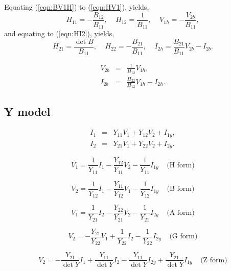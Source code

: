 \documentclass[a4paper, 12pt]{article}
\newcommand{\bigspace}{\;\;\;\;}
\newcommand{\refeqn}[1]{\mbox{(\ref{eqn:#1})}}
\begin{document}
Equating \refeqn{BV1H} to \refeqn{HV1}, yields,
%
\begin{equation}
  H_{11} = -\frac{B_{12}}{B_{11}}, \bigspace H_{12} = \frac{1}{B_{11}}, \bigspace V_{1h} = -\frac{V_{2b}}{B_{11}},
\end{equation}
%
and equating to \refeqn{HI2}, yields,
%
\begin{equation}
  H_{21} = \frac{\det{B}}{B_{11}}, \bigspace H_{22} = -\frac{B_{21}}{B_{11}}, \bigspace I_{2h} = \frac{B_{21}}{B_{11}} V_{2b} - I_{2b}.
\end{equation}


\begin{eqnarray}
  V_{2b} & = & \frac{1}{H_{12}} V_{1h}, \\
  I_{2b} & = & \frac{H_{22}}{H_{12}} V_{1h} - I_{2h}.
\end{eqnarray}




\subsection{Y model}

\begin{eqnarray}
\label{eqn:YI1}
  I_1 & = & Y_{11} V_1 + Y_{12} V_2 + I_{1y}, \\
  I_2 & = & Y_{21} V_1 + Y_{22} V_2 + I_{2y}.
\label{eqn:YI2}
\end{eqnarray}



\begin{equation}
  V_1 = \frac{1}{Y_{11}} I_1 - \frac{Y_{12}}{Y_{11}} V_2 - \frac{1}{Y_{11}} I_{1y} \bigspace \mbox{(H form)}
\end{equation}

\begin{equation}
  V_2 = \frac{1}{Y_{12}} I_1 - \frac{Y_{11}}{Y_{12}} V_1 - \frac{1}{Y_{12}} I_{1y} \bigspace \mbox{(B form)}
\end{equation}

\begin{equation}
  V_1 = \frac{1}{Y_{21}} I_2 - \frac{Y_{22}}{Y_{21}} V_2 - \frac{1}{Y_{21}} I_{2y} \bigspace \mbox{(A form)}
\end{equation}


\begin{equation}
  V_2 = -\frac{Y_{21}}{Y_{22}} V_1 + \frac{1}{Y_{22}} I_2 - \frac{1}{Y_{22}} I_{2y} \bigspace \mbox{(G form)}
\end{equation}


\begin{equation}
  V_2 = -\frac{Y_{21}}{\det{Y}} I_1 + \frac{Y_{11}}{\det{Y}} I_2 - \frac{Y_{11}}{\det{Y}} I_{2y} + \frac{Y_{21}}{\det{Y}} I_{1y} \bigspace \mbox{(Z form)}
\end{equation}
\end{document}

